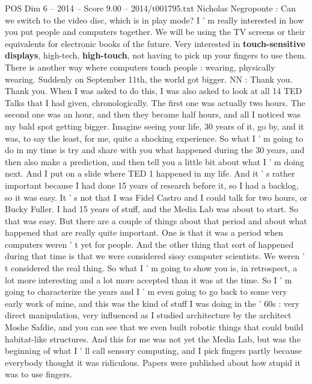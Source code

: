 \begin{textsample}{POS Dim 6 – 2014 – Score 9.00 – 2014/t001795.txt}  \label{ex:f6_pos_047}
Nicholas Negroponte : Can we switch to the video disc, which is in play mode?
I ' m really interested in how you put people and computers together.
We will be using the TV screens or their equivalents for electronic books of the future.
Very interested in \textbf{touch-sensitive} \textbf{displays}, high-tech, \textbf{high-touch}, not having to pick up your fingers to use them.
There is another way where computers touch people : wearing, physically wearing.
Suddenly on September 11th, the world got bigger.
NN : Thank you.
Thank you.
When I was asked to do this, I was also asked to look at all 14 TED Talks that I had given, chronologically.
The first one was actually two hours.
The second one was an hour, and then they became half hours, and all I noticed was my bald spot getting bigger.
Imagine seeing your life, 30 years of it, go by, and it was, to say the least, for me, quite a shocking experience.
So what I ' m going to do in my time is try and share with you what happened during the 30 years, and then also make a prediction, and then tell you a little bit about what I ' m doing next.
And I put on a slide where TED 1 happened in my life.
And it ' s rather important because I had done 15 years of research before it, so I had a backlog, so it was easy.
It ' s not that I was Fidel Castro and I could talk for two hours, or Bucky Fuller.
I had 15 years of stuff, and the Media Lab was about to start.
So that was easy.
But there are a couple of things about that period and about what happened that are really quite important.
One is that it was a period when computers weren ' t yet for people.
And the other thing that sort of happened during that time is that we were considered sissy computer scientists.
We weren ' t considered the real thing.
So what I ' m going to show you is, in retrospect, a lot more interesting and a lot more accepted than it was at the time.
So I ' m going to characterize the years and I ' m even going to go back to some very early work of mine, and this was the kind of stuff I was doing in the ' 60s : very direct manipulation, very influenced as I studied architecture by the architect Moshe Safdie, and you can see that we even built robotic things that could build habitat-like structures.
And this for me was not yet the Media Lab, but was the beginning of what I ' ll call sensory computing, and I pick fingers partly because everybody thought it was ridiculous.
Papers were published about how stupid it was to use fingers.

\end{textsample}
